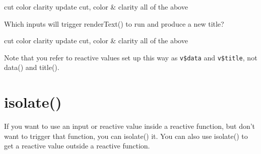 \documentclass[
]{book}
\begin{document}
cut color clarity update cut, color \& clarity all of the above

Which inputs will trigger renderText() to run and produce a new title?

cut color clarity update cut, color \& clarity all of the above

Note that you refer to reactive values set up this way as \texttt{v\$data} and \texttt{v\$title}, not data() and title().

\hypertarget{isolate}{%
\section{isolate()}\label{isolate}}

If you want to use an input or reactive value inside a reactive function, but don't want to trigger that function, you can isolate() it. You can also use isolate() to get a reactive value outside a reactive function.
\end{document}
